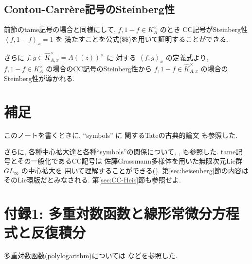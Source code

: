 \documentclass[12pt,twoside]{jarticle}
\theoremstyle{definition} %
\theoremstyle{definition} %
\theoremstyle{definition} %
\numberwithin{theorem}{section}
\numberwithin{equation}{section}
\numberwithin{figure}{section}
\numberwithin{table}{section}
\newcommand\secref[1]{第\ref{#1}節}
\newcommand\Khat{{\widehat K}}
\newcommand\CC[3]{\left\langle #2,#3\right\rangle_{#1}}
\begin{document}

\subsection{Contou-Carr\`ere記号のSteinberg性}

前節のtame記号の場合と同様にして,
$f,1-f\in K_A^\times$ のとき
CC記号がSteinberg性 $\CC{x}{f}{1-f}=1$ を
満たすことを公式($\$\$$)を用いて証明することができる.

さらに $f,g\in\Khat_{A,x}^\times=A((z))^\times$ に
対する $\CC{x}{f}{g}$ の定義式より,
$f,1-f\in K_A^\times$ の場合のCC記号のSteinberg性から
$f,1-f\in \Khat_{A,x}^\times$ の場合のSteinberg性が導かれる.


\section{補足}

このノートを書くときに, ``symbols'' に
関するTateの古典的論文 \cite{tate} も参照した.

さらに, 各種中心拡大達と各種``symbols''の関係について,
\cite{brylinski},
\cite{anderson-pablosromo}
も参照した. tame記号とその一般化であるCC記号は
佐藤Grassmann多様体を用いた無限次元Lie群 $GL_\infty$ の中心拡大を
用いて理解することができる(\cite{anderson-pablosromo}).
\secref{sec:heisenberg}の内容はそのLie環版だとみなされる.
\secref{sec:CC-Heis}も参照せよ.


\section{付録1: 多重対数函数と線形常微分方程式と反復積分}
\label{sec:polylog}

多重対数函数(polylogarithm)については \cite{hain} などを参照した.
\end{document}
